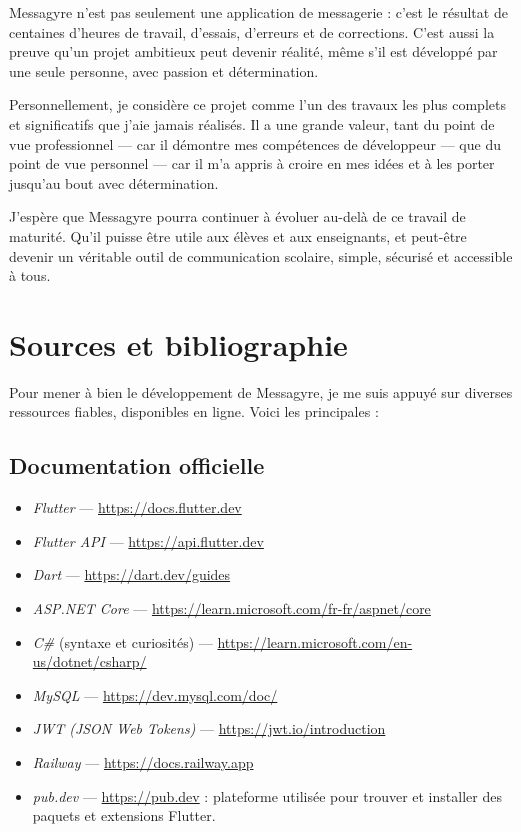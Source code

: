 \documentclass[12pt]{report}
\begin{document}
Messagyre n’est pas seulement une application de messagerie : c’est le résultat de centaines d’heures de travail, d’essais, d’erreurs et de corrections. C’est aussi la preuve qu’un projet ambitieux peut devenir réalité, même s’il est développé par une seule personne, avec passion et détermination.

Personnellement, je considère ce projet comme l’un des travaux les plus complets et significatifs que j’aie jamais réalisés. Il a une grande valeur, tant du point de vue professionnel — car il démontre mes compétences de développeur — que du point de vue personnel — car il m’a appris à croire en mes idées et à les porter jusqu’au bout avec détermination.

J’espère que Messagyre pourra continuer à évoluer au-delà de ce travail de maturité. Qu’il puisse être utile aux élèves et aux enseignants, et peut-être devenir un véritable outil de communication scolaire, simple, sécurisé et accessible à tous.


\chapter{Sources et bibliographie}

Pour mener à bien le développement de Messagyre, je me suis appuyé sur diverses ressources fiables, disponibles en ligne. Voici les principales :

\printbibliography

\section{Documentation officielle}

\begin{itemize}
	\item \textit{Flutter} — \url{https://docs.flutter.dev}
	\item \textit{Flutter API} — \url{https://api.flutter.dev}
	\item \textit{Dart} — \url{https://dart.dev/guides}
	\item \textit{ASP.NET Core} — \url{https://learn.microsoft.com/fr-fr/aspnet/core}
	\item \textit{C\#} (syntaxe et curiosités) — \url{https://learn.microsoft.com/en-us/dotnet/csharp/}
	\item \textit{MySQL} — \url{https://dev.mysql.com/doc/}
	\item \textit{JWT (JSON Web Tokens)} — \url{https://jwt.io/introduction}
	\item \textit{Railway} — \url{https://docs.railway.app}
	\item \textit{pub.dev} — \url{https://pub.dev} : plateforme utilisée pour trouver et installer des paquets et extensions Flutter.
\end{itemize}
\end{document}
